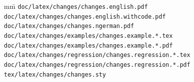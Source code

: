 \begin{tabbing}
	mm\=\kill
	\>\texttt{doc/latex/changes/changes.english.pdf}\\
	\>\texttt{doc/latex/changes/changes.english.withcode.pdf}\\
	\>\texttt{doc/latex/changes/changes.ngerman.pdf}\\

	\>\texttt{doc/latex/changes/examples/changes.example.*.tex}\\
	\>\texttt{doc/latex/changes/examples/changes.example.*.pdf}\\

	\>\texttt{doc/latex/changes/regression/changes.regression.*.tex}\\
	\>\texttt{doc/latex/changes/regression/changes.regression.*.pdf}\\

	\>\texttt{tex/latex/changes/changes.sty}
\end{tabbing}


